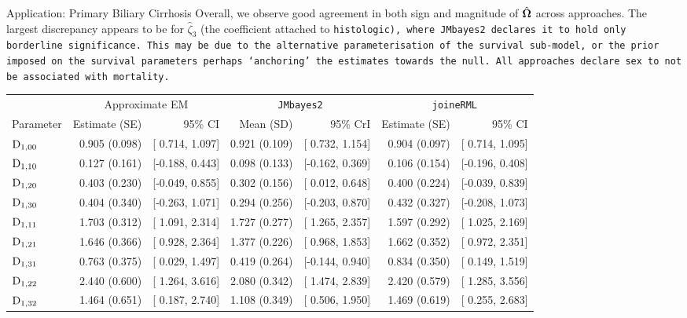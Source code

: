 \begin{chapter}{\label{cha:app-PBC}Application: Primary Biliary Cirrhosis}
  Overall, we observe good agreement in both sign and magnitude of $\hat{\bm{\Omega}}$ across approaches. The largest discrepancy appears to be for $\hat{\zeta}_3$ (the coefficient attached to \tt{histologic}), where \tt{JMbayes2} declares it to hold only borderline significance. This may be due to the alternative parameterisation of the survival sub-model, or the prior imposed on the survival parameters perhaps `anchoring' the estimates towards the null. All approaches declare sex to not be associated with mortality.
  \begin{table}[ht]
  \centering
  \captionsetup{font=scriptsize}
  \begingroup\scriptsize
  \setlength{\tabcolsep}{3pt} %
  \begin{tabular}{lrrrrrr}
    & \multicolumn{2}{c}{Approximate EM} & \multicolumn{2}{c}{\tt{JMbayes2}} & \multicolumn{2}{c}{\tt{joineRML}}\\
    Parameter & Estimate (SE) & 95\% CI & Mean (SD) & 95\% CrI & Estimate (SE) & 95\% CI\\
    \hline
    $\mathrm{D}_{1,00}$ & 0.905 (0.098) & [ 0.714, 1.097] & 0.921 (0.109) & [ 0.732, 1.154] & 0.904 (0.097) & [ 0.714, 1.095] \\ 
    $\mathrm{D}_{1,10}$ & 0.127 (0.161) & [-0.188, 0.443] & 0.098 (0.133) & [-0.162, 0.369] & 0.106 (0.154) & [-0.196, 0.408] \\ 
    $\mathrm{D}_{1,20}$ & 0.403 (0.230) & [-0.049, 0.855] & 0.302 (0.156) & [ 0.012, 0.648] & 0.400 (0.224) & [-0.039, 0.839] \\ 
    $\mathrm{D}_{1,30}$ & 0.404 (0.340) & [-0.263, 1.071] & 0.294 (0.256) & [-0.203, 0.870] & 0.432 (0.327) & [-0.208, 1.073] \\ 
    $\mathrm{D}_{1,11}$ & 1.703 (0.312) & [ 1.091, 2.314] & 1.727 (0.277) & [ 1.265, 2.357] & 1.597 (0.292) & [ 1.025, 2.169] \\ 
    $\mathrm{D}_{1,21}$ & 1.646 (0.366) & [ 0.928, 2.364] & 1.377 (0.226) & [ 0.968, 1.853] & 1.662 (0.352) & [ 0.972, 2.351] \\ 
    $\mathrm{D}_{1,31}$ & 0.763 (0.375) & [ 0.029, 1.497] & 0.419 (0.264) & [-0.144, 0.940] & 0.834 (0.350) & [ 0.149, 1.519] \\ 
    $\mathrm{D}_{1,22}$ & 2.440 (0.600) & [ 1.264, 3.616] & 2.080 (0.342) & [ 1.474, 2.839] & 2.420 (0.579) & [ 1.285, 3.556] \\ 
    $\mathrm{D}_{1,32}$ & 1.464 (0.651) & [ 0.187, 2.740] & 1.108 (0.349) & [ 0.506, 1.950] & 1.469 (0.619) & [ 0.255, 2.683] \\ 

\end{tabular}
\end{table}
\end{chapter}
